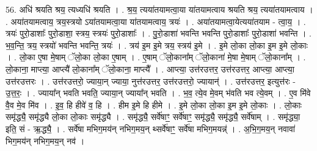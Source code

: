 \documentclass[17pt]{extarticle}
\begin{document}
56. अधि॑ श्रयति श्रय॒ त्यध्यधि॑ श्रयति । . श्र॒य॒ त्यया॑तयामत्वा॒या या॑तयामत्वाय श्रयति श्रय॒ त्यया॑तयामत्वाय । . अया॑तयामत्वाय॒ त्रय॒स्त्रयो ऽया॑तयामत्वा॒या या॑तयामत्वाय॒ त्रयः॑ । . अया॑तयामत्वा॒येत्यया॑तयाम - त्वा॒य॒ । . त्रयः॑ पुरो॒डाशाः᳚ पुरो॒डाशा॒ स्त्रय॒ स्त्रयः॑ पुरो॒डाशाः᳚ । . पु॒रो॒डाशा॑ भवन्ति भवन्ति पुरो॒डाशाः᳚ पुरो॒डाशा॑ भवन्ति । . भ॒व॒न्ति॒ त्रय॒ स्त्रयो॑ भवन्ति भवन्ति॒ त्रयः॑ । . त्रय॑ इ॒म इ॒मे त्रय॒ स्त्रय॑ इ॒मे । . इ॒मे लो॒का लो॒का इ॒म इ॒मे लो॒काः । . लो॒का ए॒षा मे॒षाम् ॅलो॒का लो॒का ए॒षाम् । . ए॒षाम् ॅलो॒काना᳚म् ॅलो॒काना॑ मे॒षा मे॒षाम् ॅलो॒काना᳚म् । . लो॒काना॒ माप्त्या॒ आप्त्यै॑ लो॒काना᳚म् ॅलो॒काना॒ माप्त्यै᳚ । . आप्त्या॒ उत्त॑र‌उत्तर॒ उत्त॑र‌उत्तर॒ आप्त्या॒ आप्त्या॒ उत्त॑र‌उत्तरः । . उत्त॑र‌उत्तरो॒ ज्याया॒न् ज्याया॒ नुत्त॑र‌उत्तर॒ उत्त॑र‌उत्तरो॒ ज्यायान्॑ । . उत्त॑र‌उत्तर॒ इत्युत्त॑रः - उ॒त्त॒रः॒ । . ज्याया᳚न् भवति भवति॒ ज्याया॒न् ज्याया᳚न् भवति । . भ॒व॒ त्ये॒व मे॒वम् भ॑वति भव त्ये॒वम् । . ए॒व मि॑वे वै॒व मे॒व मि॑व । . इ॒व॒ हि हीवे॑ व॒ हि । . हीम इ॒मे हि हीमे । . इ॒मे लो॒का लो॒का इ॒म इ॒मे लो॒काः । . लो॒काः समृ॑द्ध्यै॒ समृ॑द्ध्यै लो॒का लो॒काः समृ॑द्ध्यै । . समृ॑द्ध्यै॒ सर्वे॑षाꣳ॒॒ सर्वे॑षाꣳ॒॒ समृ॑द्ध्यै॒ समृ॑द्ध्यै॒ सर्वे॑षाम् । . समृ॑द्ध्या॒ इति॒ सं - ऋ॒द्ध्यै॒ । . सर्वे॑षा मभिग॒मय॑न् नभिग॒मय॒न् थ्सर्वे॑षाꣳ॒॒ सर्वे॑षा मभिग॒मयन्न्॑ । . अ॒भि॒ग॒मय॒न् नवावा॑ भिग॒मय॑न् नभिग॒मय॒न् नव॑ । \newline
\end{document}

